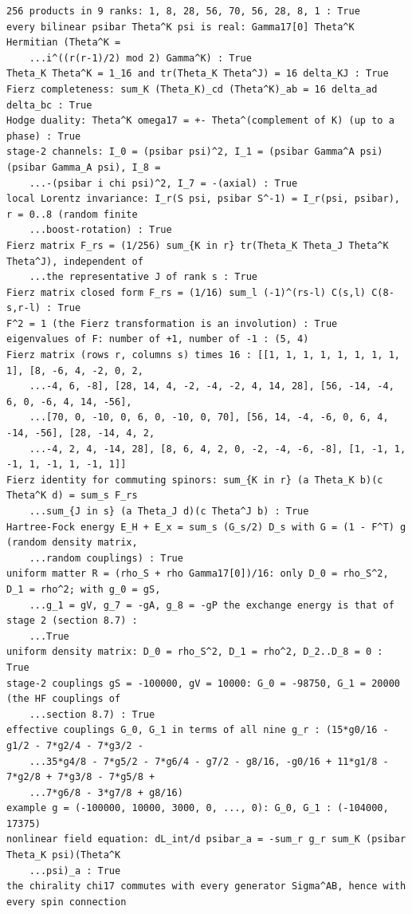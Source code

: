 \documentclass[10pt,a4paper]{article}
\begin{document}
\begin{Verbatim}[fontsize=\small,frame=single,framesep=2mm]
256 products in 9 ranks: 1, 8, 28, 56, 70, 56, 28, 8, 1 : True
every bilinear psibar Theta^K psi is real: Gamma17[0] Theta^K Hermitian (Theta^K =
    ...i^((r(r-1)/2) mod 2) Gamma^K) : True
Theta_K Theta^K = 1_16 and tr(Theta_K Theta^J) = 16 delta_KJ : True
Fierz completeness: sum_K (Theta_K)_cd (Theta^K)_ab = 16 delta_ad delta_bc : True
Hodge duality: Theta^K omega17 = +- Theta^(complement of K) (up to a phase) : True
stage-2 channels: I_0 = (psibar psi)^2, I_1 = (psibar Gamma^A psi)(psibar Gamma_A psi), I_8 =
    ...-(psibar i chi psi)^2, I_7 = -(axial) : True
local Lorentz invariance: I_r(S psi, psibar S^-1) = I_r(psi, psibar), r = 0..8 (random finite
    ...boost-rotation) : True
Fierz matrix F_rs = (1/256) sum_{K in r} tr(Theta_K Theta_J Theta^K Theta^J), independent of
    ...the representative J of rank s : True
Fierz matrix closed form F_rs = (1/16) sum_l (-1)^(rs-l) C(s,l) C(8-s,r-l) : True
F^2 = 1 (the Fierz transformation is an involution) : True
eigenvalues of F: number of +1, number of -1 : (5, 4)
Fierz matrix (rows r, columns s) times 16 : [[1, 1, 1, 1, 1, 1, 1, 1, 1], [8, -6, 4, -2, 0, 2,
    ...-4, 6, -8], [28, 14, 4, -2, -4, -2, 4, 14, 28], [56, -14, -4, 6, 0, -6, 4, 14, -56],
    ...[70, 0, -10, 0, 6, 0, -10, 0, 70], [56, 14, -4, -6, 0, 6, 4, -14, -56], [28, -14, 4, 2,
    ...-4, 2, 4, -14, 28], [8, 6, 4, 2, 0, -2, -4, -6, -8], [1, -1, 1, -1, 1, -1, 1, -1, 1]]
Fierz identity for commuting spinors: sum_{K in r} (a Theta_K b)(c Theta^K d) = sum_s F_rs
    ...sum_{J in s} (a Theta_J d)(c Theta^J b) : True
Hartree-Fock energy E_H + E_x = sum_s (G_s/2) D_s with G = (1 - F^T) g (random density matrix,
    ...random couplings) : True
uniform matter R = (rho_S + rho Gamma17[0])/16: only D_0 = rho_S^2, D_1 = rho^2; with g_0 = gS,
    ...g_1 = gV, g_7 = -gA, g_8 = -gP the exchange energy is that of stage 2 (section 8.7) :
    ...True
uniform density matrix: D_0 = rho_S^2, D_1 = rho^2, D_2..D_8 = 0 : True
stage-2 couplings gS = -100000, gV = 10000: G_0 = -98750, G_1 = 20000 (the HF couplings of
    ...section 8.7) : True
effective couplings G_0, G_1 in terms of all nine g_r : (15*g0/16 - g1/2 - 7*g2/4 - 7*g3/2 -
    ...35*g4/8 - 7*g5/2 - 7*g6/4 - g7/2 - g8/16, -g0/16 + 11*g1/8 - 7*g2/8 + 7*g3/8 - 7*g5/8 +
    ...7*g6/8 - 3*g7/8 + g8/16)
example g = (-100000, 10000, 3000, 0, ..., 0): G_0, G_1 : (-104000, 17375)
nonlinear field equation: dL_int/d psibar_a = -sum_r g_r sum_K (psibar Theta_K psi)(Theta^K
    ...psi)_a : True
the chirality chi17 commutes with every generator Sigma^AB, hence with every spin connection

\end{Verbatim}
\end{document}
